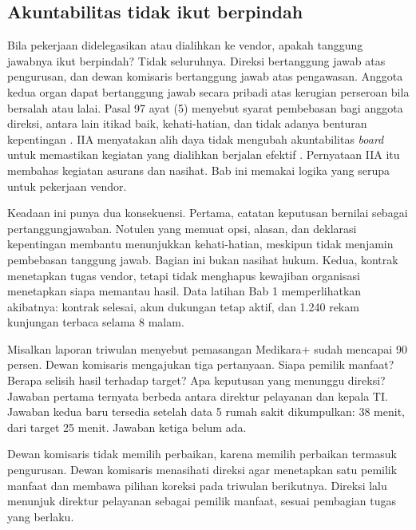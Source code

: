 \subsection*{Akuntabilitas tidak ikut berpindah}

Bila pekerjaan didelegasikan atau dialihkan ke vendor, apakah tanggung jawabnya ikut
berpindah? Tidak seluruhnya. Direksi bertanggung jawab atas pengurusan, dan dewan komisaris
bertanggung jawab atas pengawasan. Anggota kedua organ dapat bertanggung jawab secara
pribadi atas kerugian perseroan bila bersalah atau lalai. Pasal 97 ayat (5) menyebut syarat
pembebasan bagi anggota direksi, antara lain itikad baik, kehati-hatian, dan tidak adanya
benturan kepentingan \cite{c02-uu40}. IIA menyatakan alih daya tidak mengubah akuntabilitas
\textit{board} untuk memastikan kegiatan yang dialihkan berjalan efektif
\cite{iia-tlm2026}. Pernyataan IIA itu membahas kegiatan asurans dan nasihat. Bab ini
memakai logika yang serupa untuk pekerjaan vendor.

Keadaan ini punya dua konsekuensi. Pertama, catatan keputusan bernilai sebagai
pertanggungjawaban. Notulen yang memuat opsi, alasan, dan deklarasi kepentingan membantu
menunjukkan kehati-hatian, meskipun tidak menjamin pembebasan tanggung jawab. Bagian ini
bukan nasihat hukum. Kedua, kontrak menetapkan tugas vendor, tetapi tidak menghapus
kewajiban organisasi menetapkan siapa memantau hasil. Data latihan Bab 1 memperlihatkan
akibatnya: kontrak selesai, akun dukungan tetap aktif, dan 1.240 rekam kunjungan terbaca
selama 8 malam.

\begin{kasus}[title={Kasus Medikara Health: Pertanyaan Komisaris pada Laporan Triwulan}]
Misalkan laporan triwulan menyebut pemasangan Medikara+ sudah mencapai 90 persen. Dewan
komisaris mengajukan tiga pertanyaan. Siapa pemilik manfaat? Berapa selisih hasil terhadap
target? Apa keputusan yang menunggu direksi? Jawaban pertama ternyata berbeda antara
direktur pelayanan dan kepala TI. Jawaban kedua baru tersedia setelah data 5 rumah sakit
dikumpulkan: 38 menit, dari target 25 menit. Jawaban ketiga belum ada.

Dewan komisaris tidak memilih perbaikan, karena memilih perbaikan termasuk pengurusan.
Dewan komisaris menasihati direksi agar menetapkan satu pemilik manfaat dan membawa pilihan
koreksi pada triwulan berikutnya. Direksi lalu menunjuk direktur pelayanan sebagai pemilik
manfaat, sesuai pembagian tugas yang berlaku.
\end{kasus}

